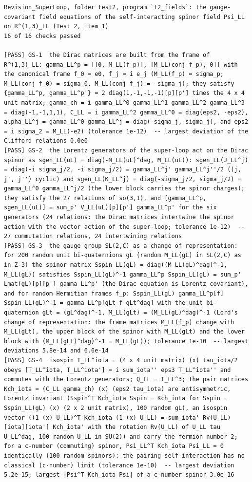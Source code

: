 \documentclass[
  10pt,
]{article}
\begin{document}
\begin{verbatim}
Revision_SuperLoop, folder test2, program `t2_fields`: the gauge-covariant field equations of the self-interacting spinor field Psi_LL on R^(1,3)_LL (Test 2, item 1)
16 of 16 checks passed

[PASS] GS-1  the Dirac matrices are built from the frame of R^(1,3)_LL: gamma_LL^p = [[0, M_LL(f_p)], [M_LL(conj f_p), 0]] with the canonical frame f_0 = e0, f_j = i e_j (M_LL(f_p) = sigma_p; M_LL(conj f_0) = sigma_0, M_LL(conj f_j) = -sigma_j); they satisfy {gamma_LL^p, gamma_LL^p'} = 2 diag(1,-1,-1,-1)[p][p'] times the 4 x 4 unit matrix; gamma_ch = i gamma_LL^0 gamma_LL^1 gamma_LL^2 gamma_LL^3 = diag(-1,-1,1,1), C_LL = i gamma_LL^2 gamma_LL^0 = diag(eps2, -eps2), alpha_LL^j = gamma_LL^0 gamma_LL^j = diag(-sigma_j, sigma_j), and eps2 = i sigma_2 = M_LL(-e2) (tolerance 1e-12)  -- largest deviation of the Clifford relations 0.0e0
[PASS] GS-2  the Lorentz generators of the super-loop act on the Dirac spinor as sgen_LL(uL) = diag(-M_LL(uL)^dag, M_LL(uL)): sgen_LL(J_LL^j) = diag(-i sigma_j/2, -i sigma_j/2) = gamma_LL^j' gamma_LL^j''/2 ((j, j', j'') cyclic) and sgen_LL(K_LL^j) = diag(-sigma_j/2, sigma_j/2) = gamma_LL^0 gamma_LL^j/2 (the lower block carries the spinor charges); they satisfy the 27 relations of so(3,1), and [gamma_LL^p, sgen_LL(uL)] = sum_p' V_LL(uL)[p][p'] gamma_LL^p' for the six generators (24 relations: the Dirac matrices intertwine the spinor action with the vector action of the super-loop; tolerance 1e-12)  -- 27 commutation relations, 24 intertwining relations
[PASS] GS-3  the gauge group SL(2,C) as a change of representation: for 200 random unit bi-quaternions gL (random M_LL(gL) in SL(2,C) as in Z-3) the spinor matrix Sspin_LL(gL) = diag((M_LL(gL)^dag)^-1, M_LL(gL)) satisfies Sspin_LL(gL)^-1 gamma_LL^p Sspin_LL(gL) = sum_p' Lmat(gL)[p][p'] gamma_LL^p' (the Dirac equation is Lorentz covariant), and for random Hermitian frames f_p: Sspin_LL(gL) gamma_LL^p[f] Sspin_LL(gL)^-1 = gamma_LL^p[gLt f gLt^dag] with the unit bi-quaternion gLt = (gL^dag)^-1, M_LL(gLt) = (M_LL(gL)^dag)^-1 (Lord's change of representation: the frame matrices M_LL(f_p) change with M_LL(gLt), the upper block of the spinor with M_LL(gLt) and the lower block with (M_LL(gLt)^dag)^-1 = M_LL(gL)); tolerance 1e-10  -- largest deviations 5.8e-14 and 6.6e-14
[PASS] GS-4  isospin T_LL^iota = (4 x 4 unit matrix) (x) tau_iota/2 obeys [T_LL^iota, T_LL^iota'] = i sum_iota'' eps3 T_LL^iota'' and commutes with the Lorentz generators; Q_LL = T_LL^3; the pair matrices Kch_iota = (C_LL gamma_ch) (x) (eps2 tau_iota) are antisymmetric, Lorentz invariant (Sspin^T Kch_iota Sspin = Kch_iota for Sspin = Sspin_LL(gL) (x) (2 x 2 unit matrix), 100 random gL), an isospin vector ((1 (x) U_LL)^T Kch_iota (1 (x) U_LL) = sum_iota' Rv(U_LL)[iota][iota'] Kch_iota' with the rotation Rv(U_LL) of U_LL tau U_LL^dag, 100 random U_LL in SU(2)) and carry the fermion number 2; for a c-number (commuting) spinor, Psi_LL^T Kch_iota Psi_LL = 0 identically (100 random spinors): the pairing self-interaction has no classical (c-number) limit (tolerance 1e-10)  -- largest deviation 5.2e-15; largest |Psi^T Kch_iota Psi| of a c-number spinor 3.0e-16

\end{verbatim}
\end{document}
